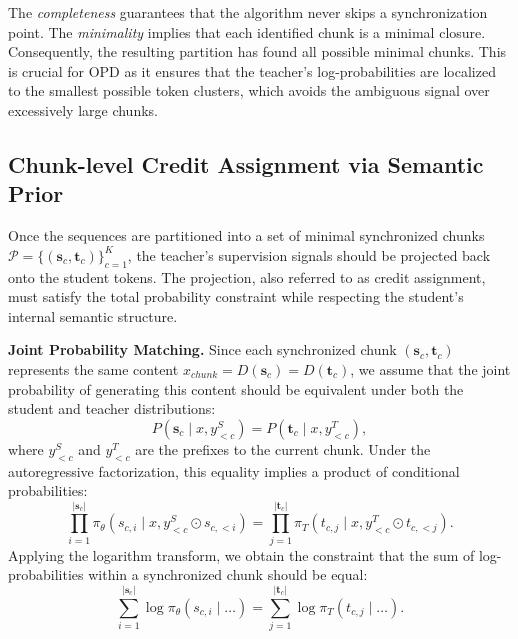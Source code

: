 \documentclass{article}
\theoremstyle{plain}
\theoremstyle{definition}
\theoremstyle{remark}
\begin{document}
The \textit{completeness} guarantees that the algorithm never skips a synchronization point.  The \textit{minimality} implies that each identified chunk is a minimal closure. Consequently, the resulting partition has found all possible minimal chunks. This is crucial for OPD as it ensures that the teacher's log-probabilities are localized to the smallest possible token clusters, which avoids the ambiguous signal over excessively large chunks.

\subsection{Chunk-level Credit Assignment via Semantic Prior}

Once the sequences are partitioned into a set of minimal synchronized chunks $\mathcal{P} = \{ (\bm{s}_c, \bm{t}_c) \}_{c=1}^K$, the teacher's supervision signals should be projected back onto the student tokens. The projection, also referred to as credit assignment, must satisfy the total probability constraint while respecting the student's internal semantic structure.

\textbf{Joint Probability Matching.} Since each synchronized chunk $(\bm{s}_c, \bm{t}_c)$ represents the same content $x_{chunk} = D(\bm{s}_c) = D(\bm{t}_c)$, we assume that the joint probability of generating this content should be equivalent under both the student and teacher distributions:
\begin{equation}
P(\bm{s}_c \mid x, y^S_{<c}) = P(\bm{t}_c \mid x, y^T_{<c}),
\end{equation}
where $y^S_{<c}$ and $y^T_{<c}$ are the prefixes to the current chunk. Under the autoregressive factorization, this equality implies a product of conditional probabilities:
\begin{equation}\prod_{i=1}^{|\bm{s}_c|} \pi_{\theta}(s_{c,i} \mid x, y^S_{<c} \odot s_{c,<i}) = \prod_{j=1}^{|\bm{t}_c|} \pi_T(t_{c,j} \mid x, y^T_{<c} \odot t_{c,<j}).
\end{equation}
Applying the logarithm transform, we obtain the constraint that the sum of log-probabilities within a synchronized chunk should be equal:
\begin{equation}
\label{eq:sum_constraint}
\sum_{i=1}^{|\bm{s}_c|} \log \pi_{\theta}(s_{c,i} \mid \dots) = \sum_{j=1}^{|\bm{t}_c|} \log \pi_T(t_{c,j} \mid \dots).
\end{equation}
\end{document}
